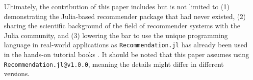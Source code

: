 Ultimately, the contribution of this paper includes but is not limited to (1) demonstrating the Julia-based recommender package that had never existed, (2) sharing the scientific background of the field of recommender systems with the Julia community, and (3) lowering the bar to use the unique programming language in real-world applications as \texttt{Recommendation.jl} has already been used in the hands-on tutorial books \cite{balbaert2019julia,salceanu2018julia}. It should be noted that this paper assumes using \texttt{Recommendation.jl@v1.0.0}, meaning the details might differ in different versions.

